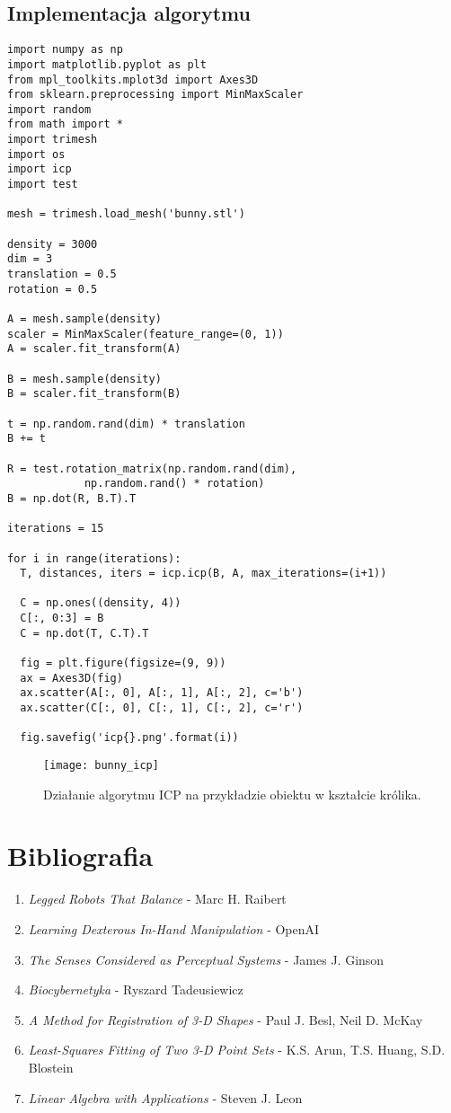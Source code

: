 \documentclass[12pt]{article}
\begin{document}
\subsection{Implementacja algorytmu}
\begin{verbatim}
import numpy as np
import matplotlib.pyplot as plt
from mpl_toolkits.mplot3d import Axes3D
from sklearn.preprocessing import MinMaxScaler
import random
from math import *
import trimesh
import os
import icp
import test

mesh = trimesh.load_mesh('bunny.stl')

density = 3000
dim = 3
translation = 0.5
rotation = 0.5

A = mesh.sample(density)
scaler = MinMaxScaler(feature_range=(0, 1))
A = scaler.fit_transform(A)

B = mesh.sample(density)
B = scaler.fit_transform(B)

t = np.random.rand(dim) * translation
B += t

R = test.rotation_matrix(np.random.rand(dim), 
			np.random.rand() * rotation)
B = np.dot(R, B.T).T

iterations = 15

for i in range(iterations):
  T, distances, iters = icp.icp(B, A, max_iterations=(i+1))

  C = np.ones((density, 4))
  C[:, 0:3] = B
  C = np.dot(T, C.T).T

  fig = plt.figure(figsize=(9, 9))
  ax = Axes3D(fig)
  ax.scatter(A[:, 0], A[:, 1], A[:, 2], c='b')
  ax.scatter(C[:, 0], C[:, 1], C[:, 2], c='r')

  fig.savefig('icp{}.png'.format(i))
\end{verbatim}

\begin{figure}[h]
\centering
\texttt{[image: bunny\_icp]}
\caption{Działanie algorytmu ICP na przykładzie obiektu w kształcie królika.}
\end{figure}

\section{Bibliografia}
\begin{enumerate}
\item \emph{Legged Robots That Balance} - Marc H. Raibert
\item \emph{Learning Dexterous In-Hand Manipulation} - OpenAI
\item \emph{The Senses Considered as Perceptual Systems} - James J. Ginson
\item \emph{Biocybernetyka} - Ryszard Tadeusiewicz
\item \emph{A Method for Registration of 3-D Shapes} - Paul J. Besl, Neil D. McKay
\item \emph{Least-Squares Fitting of Two 3-D Point Sets} - K.S. Arun, T.S. Huang, S.D. Blostein
\item \emph{Linear Algebra with Applications} - Steven J. Leon
\end{enumerate}
\end{document}
